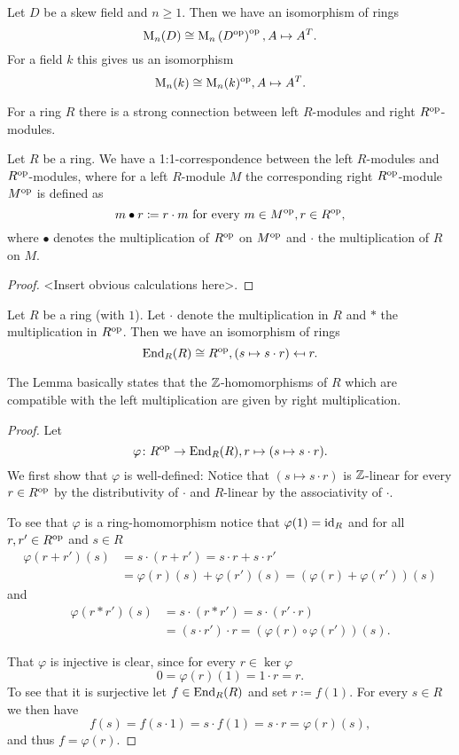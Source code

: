 \begin{expl}
 Let $D$ be a skew field and $n \geq 1$. Then we have an isomorphism of rings
 \[
  \operatorname{M}_n(D) \cong \operatorname{M}_n\left( D^{\mathrm{op}} \right)^{\mathrm{op}}, A \mapsto A^T.
 \]
 For a field $k$ this gives us an isomorphism
 \[
  \operatorname{M}_n(k) \cong \operatorname{M}_n(k)^{\mathrm{op}}, A \mapsto A^T.
 \]
\end{expl}


For a ring $R$ there is a strong connection between left $R$-modules and right $R^{\mathrm{op}}$-modules.


\begin{prop}\label{prop: opposite modules}
 Let $R$ be a ring. We have a 1:1-correspondence between the left $R$-modules and $R^{\mathrm{op}}$-modules, where for a left $R$-module $M$ the corresponding right $R^{\mathrm{op}}$-module $M^{\mathrm{op}}$ is defined as
 \[
  m \bullet r \coloneqq r \cdot m \text{ for every } m \in M^{\mathrm{op}}, r \in R^{\mathrm{op}},
 \]
 where $\bullet$ denotes the multiplication of $R^{\mathrm{op}}$ on $M^{\mathrm{op}}$ and $\cdot$ the multiplication of $R$ on $M$.
\end{prop}
\begin{proof}
 <Insert obvious calculations here>.
\end{proof}


\begin{lem}\label{lem: End_R(R) = Rop}
 Let $R$ be a ring (with $1$). Let $\cdot$ denote the multiplication in $R$ and $*$ the multiplication in $R^{\mathrm{op}}$. Then we have an isomorphism of rings
 \[
  \operatorname{End}_R(R) \cong R^{\mathrm{op}},
  (s \mapsto s \cdot r) \mapsfrom r.
 \]
\end{lem}


The Lemma basically states that the $\mathbb{Z}$-homomorphisms of $R$ which are compatible with the left multiplication are given by right multiplication.


\begin{proof}
 Let
 \[
  \varphi \colon R^{\mathrm{op}} \to \operatorname{End}_R(R), r \mapsto (s \mapsto s \cdot r).
 \]
 We first show that $\varphi$ is well-defined: Notice that $(s \mapsto s \cdot r)$ is $\mathbb{Z}$-linear for every $r \in R^{\mathrm{op}}$ by the distributivity of $\cdot$ and $R$-linear by the associativity of $\cdot$.
 
 To see that $\varphi$ is a ring-homomorphism notice that $\varphi(1) = \operatorname{id}_R$ and for all $r,r' \in R^{\mathrm{op}}$ and $s \in R$
 \begin{align*}
  \varphi(r+r')(s)
  &= s \cdot (r + r')
  = s \cdot r + s \cdot r' \\
  &= \varphi(r)(s) + \varphi(r')(s)
  = (\varphi(r)+\varphi(r'))(s)
 \end{align*}
 and
 \begin{align*}
  \varphi(r * r')(s)
  &= s \cdot (r * r')
  = s \cdot (r' \cdot r) \\
  &= (s \cdot r') \cdot r
  = \left(\varphi(r) \circ \varphi(r')\right)(s).
 \end{align*}
 
 That $\varphi$ is injective is clear, since for every $r \in \ker \varphi$
 \[
  0 = \varphi(r)(1) = 1 \cdot r = r.
 \]
 To see that it is surjective let $f \in \operatorname{End}_R(R)$ and set $r \coloneqq f(1)$. For every $s \in R$ we then have
 \[
  f(s) = f(s \cdot 1) = s \cdot f(1) = s \cdot r = \varphi(r)(s),
 \]
 and thus $f = \varphi(r)$.
\end{proof}


